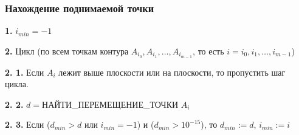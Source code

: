 \documentclass[a4paper,12pt, titlepage]{article}
\begin{document}
\subsubsection{Нахождение поднимаемой точки}
\begin{flushleft}
 \textbf{1.} $i_{min} = -1$
\end{flushleft} 
\begin{flushleft}
 \textbf{2.} Цикл (по всем точкам контура $A_{i_{0}}, A_{i_{1}}, \ldots, A_{i_{m - 1}}$,
то есть $i = i_{0}, i_{1}, \ldots, i_{m - 1}$)
\end{flushleft} 
\begin{flushleft}
 \textbf{2. 1.} Если $A_{i}$ лежит выше плоскости или на плоскости, то пропустить шаг цикла.
\end{flushleft} 
\begin{flushleft}
 \textbf{2. 2.} $d = $НАЙТИ\_ПЕРЕМЕЩЕНИЕ\_ТОЧКИ $A_{i}$
\end{flushleft} 
\begin{flushleft}
 \textbf{2. 3.} Если ($d_{min} > d$ или $i_{min} = -1$) и ($d_{min} > 10^{-15}$), то 
$d_{min} := d$, $i_{min} := i$
\end{flushleft} 
\end{document}
